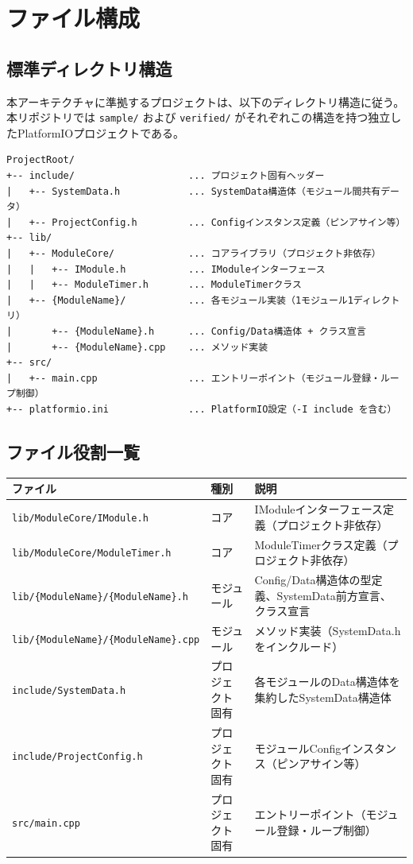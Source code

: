 \section{ファイル構成}

\subsection{標準ディレクトリ構造}

本アーキテクチャに準拠するプロジェクトは、以下のディレクトリ構造に従う。
本リポジトリでは \texttt{sample/} および \texttt{verified/} がそれぞれこの構造を持つ独立したPlatformIOプロジェクトである。

\begin{lstlisting}[basicstyle=\ttfamily\small, frame=single]
ProjectRoot/
+-- include/                    ... プロジェクト固有ヘッダー
|   +-- SystemData.h            ... SystemData構造体（モジュール間共有データ）
|   +-- ProjectConfig.h         ... Configインスタンス定義（ピンアサイン等）
+-- lib/
|   +-- ModuleCore/             ... コアライブラリ（プロジェクト非依存）
|   |   +-- IModule.h           ... IModuleインターフェース
|   |   +-- ModuleTimer.h       ... ModuleTimerクラス
|   +-- {ModuleName}/           ... 各モジュール実装（1モジュール1ディレクトリ）
|       +-- {ModuleName}.h      ... Config/Data構造体 + クラス宣言
|       +-- {ModuleName}.cpp    ... メソッド実装
+-- src/
|   +-- main.cpp                ... エントリーポイント（モジュール登録・ループ制御）
+-- platformio.ini              ... PlatformIO設定（-I include を含む）
\end{lstlisting}

\subsection{ファイル役割一覧}

\begin{tabularx}{\textwidth}{l l X}
\toprule
\textbf{ファイル} & \textbf{種別} & \textbf{説明} \\
\midrule
\texttt{lib/ModuleCore/IModule.h} & コア & IModuleインターフェース定義（プロジェクト非依存） \\
\texttt{lib/ModuleCore/ModuleTimer.h} & コア & ModuleTimerクラス定義（プロジェクト非依存） \\
\texttt{lib/\{ModuleName\}/\{ModuleName\}.h} & モジュール & Config/Data構造体の型定義、SystemData前方宣言、クラス宣言 \\
\texttt{lib/\{ModuleName\}/\{ModuleName\}.cpp} & モジュール & メソッド実装（SystemData.hをインクルード） \\
\texttt{include/SystemData.h} & プロジェクト固有 & 各モジュールのData構造体を集約したSystemData構造体 \\
\texttt{include/ProjectConfig.h} & プロジェクト固有 & モジュールConfigインスタンス（ピンアサイン等） \\
\texttt{src/main.cpp} & プロジェクト固有 & エントリーポイント（モジュール登録・ループ制御） \\
\bottomrule
\end{tabularx}

